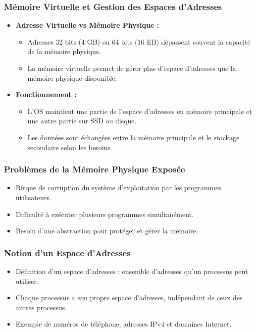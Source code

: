 \documentclass[10pt]{beamer}
\begin{document}
\begin{frame}
    \frametitle{Mémoire Virtuelle et Gestion des Espaces d'Adresses}
    \begin{itemize}
        \item \textbf{Adresse Virtuelle vs Mémoire Physique :}
              \begin{itemize}
                  \item Adresses 32 bits (4 GB) ou 64 bits (16 EB) dépassent
                        souvent la
                        capacité de la mémoire physique.
                  \item La mémoire virtuelle permet de gérer plus d'espace
                        d'adresses que
                        la mémoire physique disponible.
              \end{itemize}
        \item \textbf{Fonctionnement :}
              \begin{itemize}
                  \item L'OS maintient une partie de l'espace d'adresses en
                        mémoire
                        principale et une autre partie sur SSD ou disque.
                  \item Les données sont échangées entre la mémoire principale
                        et le
                        stockage secondaire selon les besoins.
              \end{itemize}
    \end{itemize}
\end{frame}

\begin{frame}
    \frametitle{Problèmes de la Mémoire Physique Exposée}
    \begin{itemize}
        \item Risque de corruption du système d'exploitation par les programmes
              utilisateurs.
        \item Difficulté à exécuter plusieurs programmes simultanément.
        \item Besoin d'une abstraction pour protéger et gérer la mémoire.
    \end{itemize}
\end{frame}

\begin{frame}
    \frametitle{Notion d'un Espace d'Adresses}
    \begin{itemize}
        \item Définition d'un espace d'adresses : ensemble d'adresses qu'un
              processus peut utiliser.
        \item Chaque processus a son propre espace d'adresses, indépendant de
              ceux
              des autres processus.
        \item Exemple de numéros de téléphone, adresses IPv4 et domaines
              Internet.
    \end{itemize}
\end{frame}
\end{document}
